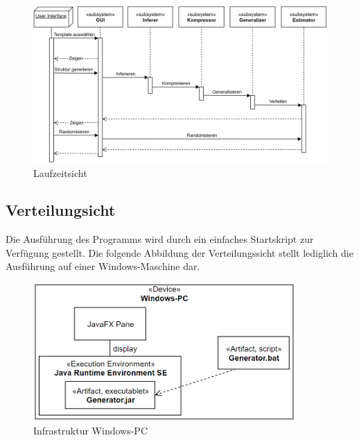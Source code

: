 \begin{figure}[H]
    \centering
    \includegraphics[width=14cm]{../images/Laufzeitsicht.PNG}
    \caption{Laufzeitsicht}
\end{figure}

\subsection*{Verteilungsicht}
Die Ausführung des Programms wird durch ein einfaches Startskript zur Verfügung gestellt.
Die folgende Abbildung der Verteilungssicht stellt lediglich die Ausführung auf einer Windows-Maschine dar.

\begin{figure}[H]
    \centering
    \includegraphics[width=10cm]{../images/Verteilungssicht.PNG}
    \caption{Infrastruktur Windows-PC}
\end{figure}

